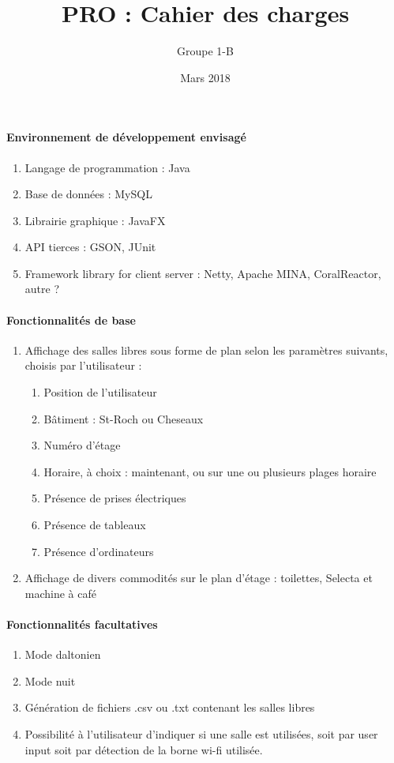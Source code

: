 \documentclass[a4paper]{article}
\title{PRO : Cahier des charges}
\author{Groupe 1-B}
\date{Mars 2018}
\begin{document}
\maketitle

\paragraph{Environnement de développement envisagé}
\begin{enumerate}
\item Langage de programmation : Java
\item Base de données : MySQL
\item Librairie graphique : JavaFX
\item API tierces : GSON, JUnit
\item Framework library for client server : Netty, Apache MINA, CoralReactor, autre ?
\end{enumerate}

\paragraph{Fonctionnalités de base}
\begin{enumerate}
\item Affichage des salles libres sous forme de plan selon les paramètres suivants, choisis par l'utilisateur :
	\begin{enumerate}
	\item Position de l'utilisateur
	\item Bâtiment : St-Roch ou Cheseaux
	\item Numéro d'étage
	\item Horaire, à choix : maintenant, ou sur une ou plusieurs plages horaire
	\item Présence de prises électriques
	\item Présence de tableaux
	\item Présence d'ordinateurs
    \end{enumerate}
\item Affichage de divers commodités sur le plan d'étage : toilettes, Selecta et machine à café
\end{enumerate} 

\paragraph{Fonctionnalités facultatives}
\begin{enumerate}
\item Mode daltonien
\item Mode nuit
\item Génération de fichiers .csv ou .txt contenant les salles libres
\item Possibilité à l'utilisateur d'indiquer si une salle est utilisées, soit par user input soit par détection de la borne wi-fi utilisée.
\end{enumerate} 
\end{document}
